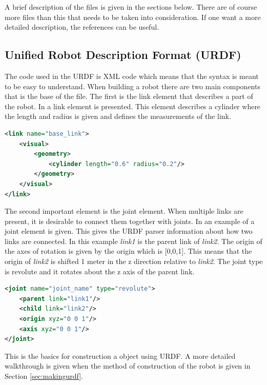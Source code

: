A brief description of the files is given in the sections below. There are of course more files than this that needs to be taken into consideration. If one want a more detailed description, the references \cite{ROSWiki,GazeboURDF,XMLdoc,YAMLdoc} can be useful.

\subsection{Unified Robot Description Format (URDF)}\label{sec:basicURDF}
The code used in the URDF is XML code which means that the syntax is meant to be easy to understand\cite{XMLdoc}. When building a robot there are two main components that is the base of the file. The first is the link element that describes a part of the robot. In  a link element is presented. This element describes a cylinder where the length and radius is given and defines the measurements of the link. 

\begin{lstlisting}[language=xml,caption={URDF code example of a link element},label={lst:example}]
<link name="base_link">
    <visual>
        <geometry>
            <cylinder length="0.6" radius="0.2"/>
        </geometry>
    </visual>
</link>
\end{lstlisting}

The second important element is the joint element. When multiple links are present, it is desirable to connect them together with joints. In  an example of a joint element is given. This gives the URDF parser information about how two links are connected. In this example \textit{link1} is the parent link of \textit{link2}. The origin of the axes of rotation is given by the origin which is [0,0,1]. This means that the origin of \textit{link2} is shifted 1 meter in the z direction relative to \textit{link2}. The joint type is revolute and it rotates about the z axis of the parent link. 

\begin{lstlisting}[language=xml,caption={URDF code example of a joint element},label={lst:jointexample}]
<joint name="joint_name" type="revolute">
    <parent link="link1"/>
    <child link="link2"/>
    <origin xyz="0 0 1"/>
    <axis xyz="0 0 1"/>
</joint>
\end{lstlisting}

This is the basics for construction a object using URDF. A more detailed walkthrough is given when the method of construction of the robot is given in Section \ref{sec:makingurdf}\cite{ROSWiki}.


